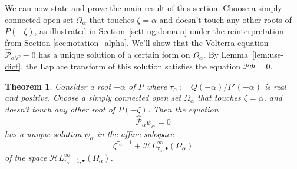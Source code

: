 \documentclass{article}
\theoremstyle{definition}
\theoremstyle{plain}
\newtheorem{thm}{Theorem}
\newcommand{\singexp}[2]{\mathcal{H}L^\infty_{#1, #2}}
\newcommand{\singexpalg}[1]{\singexp{#1}{\bullet}}
\newcommand{\domain}{\Omega}
\begin{document}
We can now state and prove the main result of this section. Choose a simply connected open set $\domain_\alpha$ that touches $\zeta = \alpha$ and doesn't touch any other roots of $P(-\zeta)$, as illustrated in Section~\ref{setting:domain} under the reinterpretation from Section \ref{sec:notation_alpha}. We'll show that the Volterra equation $\hat{\mathcal{P}}_\alpha \varphi = 0$ has a unique solution of a certain form on $\domain_\alpha$. By Lemma~\ref{lem:use-dict}, the Laplace transform of this solution satisfies the equation $\mathcal{P}\Phi = 0$.
\begin{thm}\label{thm:example}
Consider a root $-\alpha$ of $P$ where $\tau_\alpha := Q(-\alpha)/P'(-\alpha)$ is real and positive. Choose a simply connected open set $\domain_\alpha$ that touches $\zeta = \alpha$, and doesn't touch any other root of $P(-\zeta)$. Then the equation
\[ \hat{\mathcal{P}}_\alpha \psi_\alpha = 0 \]
has a unique solution $\psi_\alpha$ in the affine subspace
\[ \zeta^{\tau_\alpha-1} + \singexpalg{\tau_\alpha}(\domain_\alpha) \]
of the space $\singexpalg{\tau_\alpha-1}(\domain_\alpha)$.
\end{thm}
\end{document}
